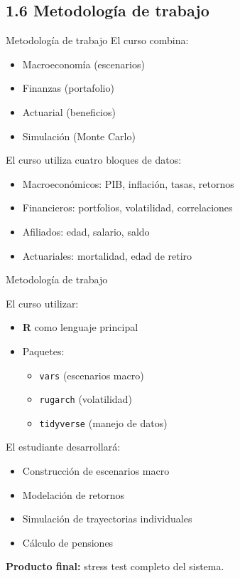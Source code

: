 \documentclass{beamer}
\begin{document}
\subsection{1.6 Metodología de trabajo}
\begin{frame}{Metodología de trabajo}
El curso combina:
\begin{itemize}
    \item Macroeconomía (escenarios)
    \item Finanzas (portafolio)
    \item Actuarial (beneficios)
    \item Simulación (Monte Carlo)
\end{itemize}
\vspace{0.4cm}

El curso utiliza cuatro bloques de datos:

\begin{itemize}
\item Macroeconómicos: PIB, inflación, tasas, retornos
\item Financieros: portfolios, volatilidad, correlaciones
\item Afiliados: edad, salario, saldo
\item Actuariales: mortalidad, edad de retiro
\end{itemize}

\end{frame}
\begin{frame}{Metodología de trabajo}

El curso utilizar:
\begin{itemize}
    \item \textbf{R} como lenguaje principal
    \item Paquetes:
    \begin{itemize}
        \item \texttt{vars} (escenarios macro)
        \item \texttt{rugarch} (volatilidad)
        \item \texttt{tidyverse} (manejo de datos)
    \end{itemize}
\end{itemize}

El estudiante desarrollará:

\begin{itemize}
    \item Construcción de escenarios macro
    \item Modelación de retornos
    \item Simulación de trayectorias individuales
    \item Cálculo de pensiones
\end{itemize}

\vspace{0.5cm}
\textbf{Producto final:} stress test completo del sistema.

  
\end{frame}
\end{document}
